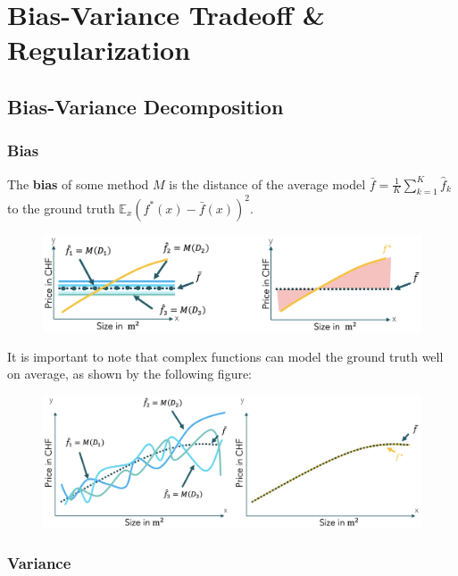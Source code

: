 \documentclass[a4paper]{extarticle}
\begin{document}
\section{Bias-Variance Tradeoff \& Regularization}

\subsection{Bias-Variance Decomposition}

\subsubsection{Bias}

The \textbf{bias} of some method \(M\) is the distance of the average model \(\bar{f} = \frac{1}{K} \sum_{k = 1}^K \hat{f}_k\) to the ground truth \(\mathbb{E}_x (f^*(x) - \bar{f}(x))^2\).

\begin{figure}[H]
    \includegraphics[width=15cm]{../images/IntroML_Fig3-17}
    \centering
\end{figure}

It is important to note that complex functions can model the ground truth well on average, as shown by the following figure:

\begin{figure}[H]
    \includegraphics[width=15cm]{../images/IntroML_Fig3-18}
    \centering
\end{figure}

\subsubsection{Variance}
\end{document}
